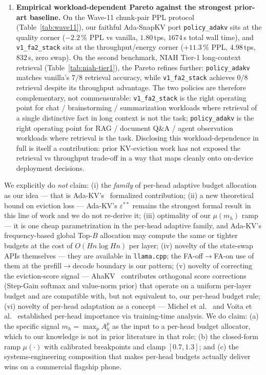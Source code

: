 \documentclass[sigconf, anonymous=false, screen=true]{acmart}
\begin{document}
\begin{enumerate}
\item \textbf{Empirical workload-dependent Pareto against the strongest prior-art baseline.} On the Wave-11 chunk-pair PPL protocol (Table~\ref{tab:wave11}), our faithful Ada-SnapKV port \texttt{policy\_adakv} sits at the quality corner ($-2.2\,\%$ PPL vs vanilla, $1.80$\,tps, $1674$\,s total wall time), and \texttt{v1\_fa2\_stack} sits at the throughput/energy corner ($+11.3\,\%$ PPL, $4.98$\,tps, $832$\,s, zero swap). On the second benchmark, NIAH Tier-1 long-context retrieval (Table~\ref{tab:niah-tier1}), the Pareto refines further: \texttt{policy\_adakv} matches vanilla's $7/8$ retrieval accuracy, while \texttt{v1\_fa2\_stack} achieves $0/8$ retrieval despite its throughput advantage. The two policies are therefore complementary, not commensurable: \texttt{v1\_fa2\_stack} is the right operating point for chat / brainstorming / summarization workloads where retrieval of a single distinctive fact in long context is not the task; \texttt{policy\_adakv} is the right operating point for RAG / document Q\&A / agent observation workloads where retrieval is the task. Disclosing this workload-dependence in full is itself a contribution: prior KV-eviction work has not exposed the retrieval vs throughput trade-off in a way that maps cleanly onto on-device deployment decisions.
\end{enumerate}

We explicitly do \emph{not} claim: (i) the \emph{family} of per-head adaptive budget allocation as our idea --- that is Ada-KV's~\cite{feng2025adakv} formalized contribution; (ii) a new theoretical bound on eviction loss --- Ada-KV's $\varepsilon^{\ast\ast}$ remains the strongest formal result in this line of work and we do not re-derive it; (iii) optimality of our $\mu(m_h)$ ramp --- it is one cheap parametrization in the per-head adaptive family, and Ada-KV's frequency-based global Top-$B$ allocation may compute the same or tighter budgets at the cost of $O(Hn \log Hn)$ per layer; (iv) novelty of the state-swap APIs themselves --- they are available in \texttt{llama.cpp}; the FA-off$\to$FA-on use of them at the prefill$\to$decode boundary is our pattern; (v) novelty of correcting the eviction-score signal --- AhaKV~\cite{gu2025ahakv} contributes orthogonal score corrections (Step-Gain softmax and value-norm prior) that operate on a uniform per-layer budget and are compatible with, but not equivalent to, our per-head budget rule; (vi) novelty of per-head adaptation as a concept --- Michel et al.~\cite{michel2019sixteen} and Voita et al.~\cite{voita2019analyzing} established per-head importance via training-time analysis. We do claim: (a) the specific signal $m_h = \max_p A_h^p$ as the input to a per-head budget allocator, which to our knowledge is not in prior literature in that role; (b) the closed-form ramp $\mu(\cdot)$ with calibrated breakpoints and clamp $[0.7, 1.3]$; and (c) the systems-engineering composition that makes per-head budgets actually deliver wins on a commercial flagship phone.
\end{document}
